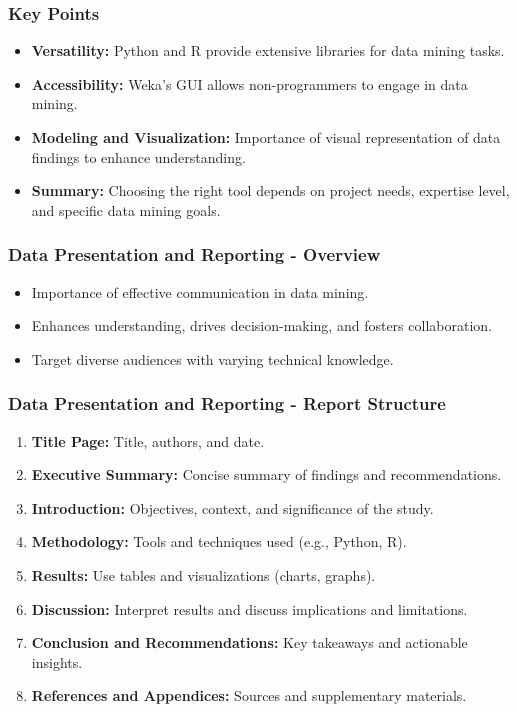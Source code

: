 \documentclass[aspectratio=169]{beamer}
\begin{document}
\begin{frame}
    \frametitle{Key Points}
    \begin{itemize}
        \item \textbf{Versatility:} Python and R provide extensive libraries for data mining tasks.
        \item \textbf{Accessibility:} Weka's GUI allows non-programmers to engage in data mining.
        \item \textbf{Modeling and Visualization:} Importance of visual representation of data findings to enhance understanding.
        \item \textbf{Summary:} Choosing the right tool depends on project needs, expertise level, and specific data mining goals.
    \end{itemize}
\end{frame}

\begin{frame}[fragile]
    \frametitle{Data Presentation and Reporting - Overview}
    \begin{itemize}
        \item Importance of effective communication in data mining.
        \item Enhances understanding, drives decision-making, and fosters collaboration.
        \item Target diverse audiences with varying technical knowledge.
    \end{itemize}
\end{frame}

\begin{frame}[fragile]
    \frametitle{Data Presentation and Reporting - Report Structure}
    \begin{enumerate}
        \item \textbf{Title Page:} Title, authors, and date.
        \item \textbf{Executive Summary:} Concise summary of findings and recommendations.
        \item \textbf{Introduction:} Objectives, context, and significance of the study.
        \item \textbf{Methodology:} Tools and techniques used (e.g., Python, R).
        \item \textbf{Results:} Use tables and visualizations (charts, graphs).
        \item \textbf{Discussion:} Interpret results and discuss implications and limitations.
        \item \textbf{Conclusion and Recommendations:} Key takeaways and actionable insights.
        \item \textbf{References and Appendices:} Sources and supplementary materials.
    \end{enumerate}
\end{frame}
\end{document}
